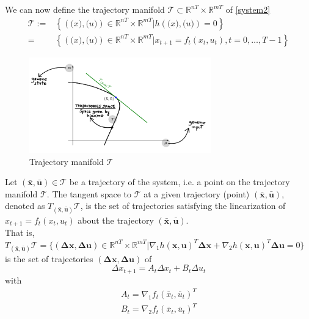 \documentclass[openany]{book}
\newcommand{\R}{\mathbb{R}}                %
\newcommand{\traj}{(\bar{\mathbf{x}},\bar{\mathbf{u}})}    %
\theoremstyle{definition}
\theoremstyle{remark}
\begin{document}
We can now define the trajectory manifold $\mathcal{T}\subset \R^{nT}\times \R^{mT}$ of \eqref{system2}
\begin{align*}
    \mathcal{T} := &\left\{\left(\mathbf(x),\mathbf(u)\right)\in\R^{nT}\times\R^{mT}|h\left(\mathbf(x),\mathbf(u)\right)=0\right\}\\=&\left\{\left(\mathbf(x),\mathbf(u)\right)\in\R^{nT}\times\R^{mT}|x_{t+1}=f_t\left(x_t,u_t\right),t=0,\dots,T-1\right\}
\end{align*}
\begin{figure}[ht]
    \centering
    \includegraphics[width=0.7\textwidth]{manifold}
    \caption{Trajectory manifold $\mathcal{T}$}
\end{figure}

Let $\traj\in\mathcal{T}$ be a trajectory of the system, i.e. a point on the trajectory manifold $\mathcal{T}$. The tangent space to $\mathcal{T}$ at a given trajectory (point) $\traj$, denoted as $T_{(\bar{\mathbf{x}},\bar{\mathbf{u}})}\mathcal{T}$, is the set of trajectories satisfying the linearization of $x_{t+1} = f_t(x_t,u_t)$ about the trajectory $(\bar{\mathbf{x}},\bar{\mathbf{u}})$.\\
That is, $T_{(\bar{\mathbf{x}},\bar{\mathbf{u}})}\mathcal{T}=\{(\mathbf{\Delta x, \Delta u})\in\R^{nT}\times\R^{mT}|\nabla_1h(\mathbf{x},\mathbf{u})^T\mathbf{\Delta x} + \nabla_2h(\mathbf{x},\mathbf{u})^T\mathbf{\Delta u} = 0\}$ is the set of trajectories $(\mathbf{\Delta x, \Delta u})$ of
\[
    \Delta x_{t+1} = A_t\Delta x_t + B_t \Delta u_t
\]
with 
\begin{gather*}
    A_t = \nabla_1f_t(\bar{x}_t,\bar{u}_t)^T\\
    B_t = \nabla_2f_t(\bar{x}_t,\bar{u}_t)^T
\end{gather*}
\end{document}
